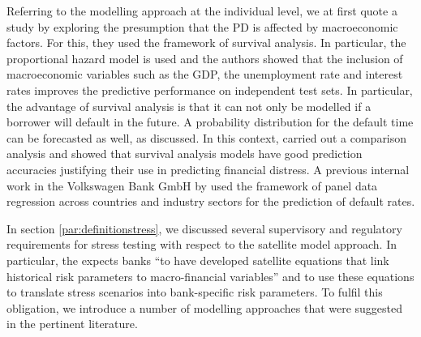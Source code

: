\documentclass[a4paper, 12pt]{scrreprt}
\begin{document}
Referring to the modelling approach at the individual level, we at first quote a study by
\textcite{bellotti2009credit} exploring the presumption that the PD is affected by macroeconomic factors. For this, they used the framework of survival analysis. In particular, the \textcite{cox1984survival} proportional hazard model is used and the authors showed that the inclusion of macroeconomic variables such as the GDP, the unemployment rate and interest rates improves the predictive performance on independent test sets. In particular, the advantage of survival analysis is that it can not only be modelled if a borrower will default in the future. A probability distribution for the default time can be forecasted as well, as \textcite{banasik1999notifbutwhen} discussed.
In this context, \textcite{gepp2015predicting} carried out a comparison analysis and showed that survival analysis models have good prediction accuracies justifying their use in predicting financial distress.
A previous internal work in the Volkswagen Bank GmbH by \textcite{ivanchenko2017predicting} used the framework of panel data regression across countries and industry sectors for the prediction of default rates.

In section \ref{par:definitionstress}, we discussed several supervisory and regulatory requirements for stress testing with respect to the satellite model approach. 
In particular, the \textcite[p. 17]{ecb2018srep} expects banks ``to have developed satellite equations that link historical risk parameters to macro-financial variables'' and to use these equations to translate stress scenarios into bank-specific risk parameters. To fulfil this obligation, we introduce a number of modelling approaches that were suggested in the pertinent literature. 
\end{document}
